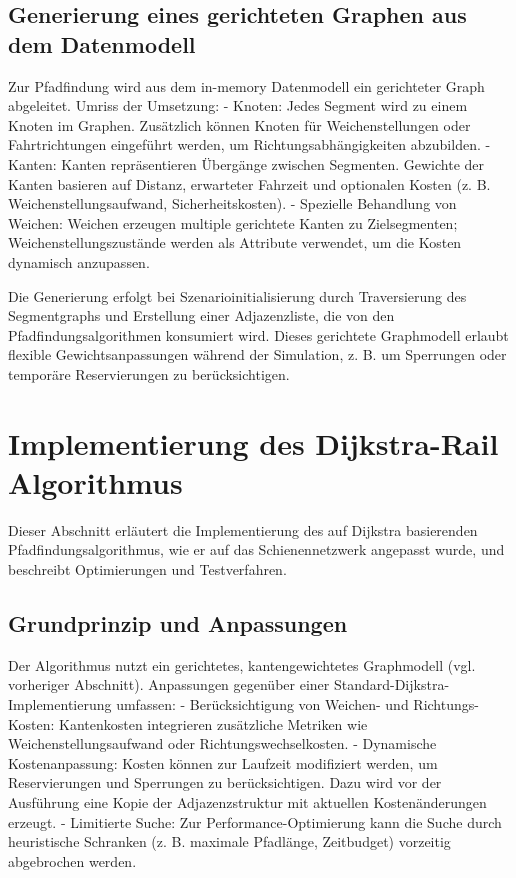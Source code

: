 \subsection*{Generierung eines gerichteten Graphen aus dem Datenmodell}
Zur Pfadfindung wird aus dem in-memory Datenmodell ein gerichteter Graph abgeleitet. Umriss der Umsetzung:
- Knoten: Jedes Segment wird zu einem Knoten im Graphen. Zusätzlich können Knoten für Weichenstellungen oder Fahrtrichtungen eingeführt werden, um Richtungsabhängigkeiten abzubilden.
- Kanten: Kanten repräsentieren Übergänge zwischen Segmenten. Gewichte der Kanten basieren auf Distanz, erwarteter Fahrzeit und optionalen Kosten (z. B. Weichenstellungsaufwand, Sicherheitskosten).
- Spezielle Behandlung von Weichen: Weichen erzeugen multiple gerichtete Kanten zu Zielsegmenten; Weichenstellungszustände werden als Attribute verwendet, um die Kosten dynamisch anzupassen.

Die Generierung erfolgt bei Szenarioinitialisierung durch Traversierung des Segmentgraphs und Erstellung einer Adjazenzliste, die von den Pfadfindungsalgorithmen konsumiert wird. Dieses gerichtete Graphmodell erlaubt flexible Gewichtsanpassungen während der Simulation, z. B. um Sperrungen oder temporäre Reservierungen zu berücksichtigen.

\section{Implementierung des Dijkstra-Rail Algorithmus}
\label{ch:Implementierung:sec:Implementierung des Dijkstra-Rail Algorithmus}

Dieser Abschnitt erläutert die Implementierung des auf Dijkstra basierenden Pfadfindungsalgorithmus, wie er auf das Schienennetzwerk angepasst wurde, und beschreibt Optimierungen und Testverfahren.

\subsection*{Grundprinzip und Anpassungen}
Der Algorithmus nutzt ein gerichtetes, kantengewichtetes Graphmodell (vgl. vorheriger Abschnitt). Anpassungen gegenüber einer Standard-Dijkstra-Implementierung umfassen:
- Berücksichtigung von Weichen- und Richtungs-Kosten: Kantenkosten integrieren zusätzliche Metriken wie Weichenstellungsaufwand oder Richtungswechselkosten.
- Dynamische Kostenanpassung: Kosten können zur Laufzeit modifiziert werden, um Reservierungen und Sperrungen zu berücksichtigen. Dazu wird vor der Ausführung eine Kopie der Adjazenzstruktur mit aktuellen Kostenänderungen erzeugt.
- Limitierte Suche: Zur Performance-Optimierung kann die Suche durch heuristische Schranken (z. B. maximale Pfadlänge, Zeitbudget) vorzeitig abgebrochen werden.

